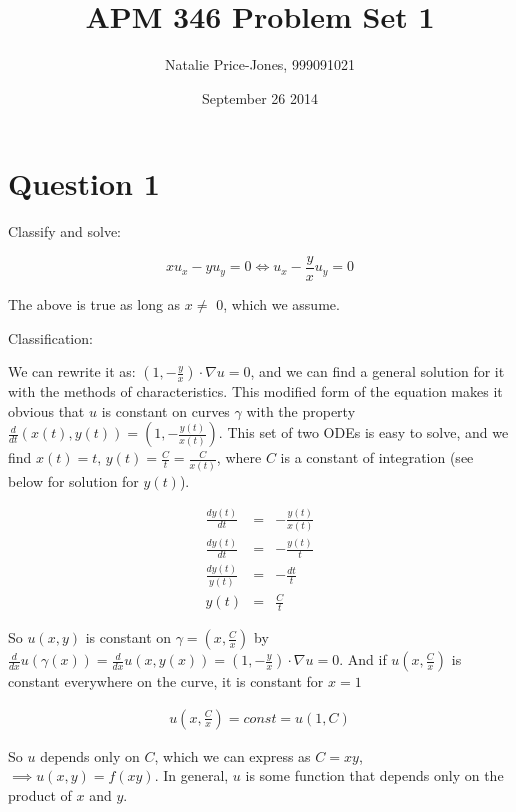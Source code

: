 \documentclass[a4paper,12pt]{article}
\begin{document}
\onehalfspacing
\title{APM 346 Problem Set 1}
\author{Natalie Price-Jones, 999091021}
\date{September 26 2014}
\maketitle

\section{Question 1}

Classify and solve:

\begin{equation}
xu_x - yu_y = 0 \Longleftrightarrow u_x - \frac{y}{x}u_y = 0\nonumber
\end{equation}

The above is true as long as $x\neq$ 0, which we assume. 

Classification: 

We can rewrite it as: $(1,-\frac{y}{x})\cdot\nabla u = 0$, and we can find a general solution for it with the methods of characteristics. This modified form of the equation makes it obvious that $u$ is constant on curves $\gamma$ with the property $\frac{d}{dt}(x(t),y(t)) = (1,-\frac{y(t)}{x(t)})$. This set of two ODEs is easy to solve, and we find $x(t) = t,\,y(t) = \frac{C}{t} = \frac{C}{x(t)}$, where $C$ is a constant of integration (see below for solution for $y(t)$).

\begin{eqnarray}
\frac{dy(t)}{dt} &=& -\frac{y(t)}{x(t)}\nonumber\\
\frac{dy(t)}{dt} &=& -\frac{y(t)}{t}\nonumber\\
\frac{dy(t)}{y(t)} &=& -\frac{dt}{t}\nonumber\\
y(t) &=& \frac{C}{t}\nonumber
\end{eqnarray}

So $u(x,y)$ is constant on $\gamma = (x,\frac{C}{x})$ by $\frac{d}{dx}u(\gamma(x)) = \frac{d}{dx}u(x,y(x)) = (1,-\frac{y}{x})\cdot\nabla u = 0$. And if $u(x,\frac{C}{x})$ is constant everywhere on the curve, it is constant for $x = 1$

\begin{eqnarray}
u(x,\frac{C}{x}) = const = u(1,C)\nonumber
\end{eqnarray}

So $u$ depends only on $C$, which we can express as $C = xy$, $\implies \boxed{u(x,y) = f(xy)}$. In general, $u$ is some function that depends only on the product of $x$ and $y$.
\end{document}
